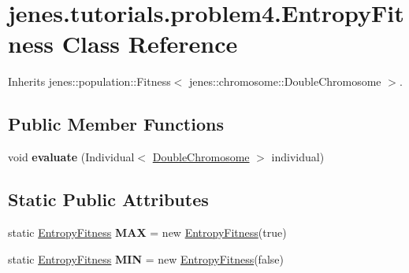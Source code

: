 \hypertarget{classjenes_1_1tutorials_1_1problem4_1_1_entropy_fitness}{
\section{jenes.tutorials.problem4.EntropyFitness Class Reference}
\label{classjenes_1_1tutorials_1_1problem4_1_1_entropy_fitness}
}
Inherits jenes::population::Fitness$<$ jenes::chromosome::DoubleChromosome $>$.

\subsection*{Public Member Functions}
\begin{CompactItemize}
\item 
\hypertarget{classjenes_1_1tutorials_1_1problem4_1_1_entropy_fitness_0e101073e060b84386ee2c10eb80a2f0}{
void \textbf{evaluate} (Individual$<$ \hyperlink{classjenes_1_1chromosome_1_1_double_chromosome}{DoubleChromosome} $>$ individual)}
\label{classjenes_1_1tutorials_1_1problem4_1_1_entropy_fitness_0e101073e060b84386ee2c10eb80a2f0}

\end{CompactItemize}
\subsection*{Static Public Attributes}
\begin{CompactItemize}
\item 
\hypertarget{classjenes_1_1tutorials_1_1problem4_1_1_entropy_fitness_015b775a1b2b1f1d5bc1eb82a560fe9a}{
static \hyperlink{classjenes_1_1tutorials_1_1problem4_1_1_entropy_fitness}{EntropyFitness} \textbf{MAX} = new \hyperlink{classjenes_1_1tutorials_1_1problem4_1_1_entropy_fitness}{EntropyFitness}(true)}
\label{classjenes_1_1tutorials_1_1problem4_1_1_entropy_fitness_015b775a1b2b1f1d5bc1eb82a560fe9a}

\item 
\hypertarget{classjenes_1_1tutorials_1_1problem4_1_1_entropy_fitness_b9c1db9f5da22216604985e98b6fc7e4}{
static \hyperlink{classjenes_1_1tutorials_1_1problem4_1_1_entropy_fitness}{EntropyFitness} \textbf{MIN} = new \hyperlink{classjenes_1_1tutorials_1_1problem4_1_1_entropy_fitness}{EntropyFitness}(false)}
\label{classjenes_1_1tutorials_1_1problem4_1_1_entropy_fitness_b9c1db9f5da22216604985e98b6fc7e4}

\end{CompactItemize}


